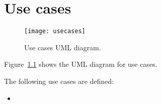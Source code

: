 \chapter{Use cases}\label{ch:usecases}

\begin{figure}[p]
	\texttt{[image: usecases]}
	\caption{Use cases UML diagram.}
	\label{fig:usecases}
\end{figure}

Figure~\ref{fig:usecases} shows the UML diagram for use cases.

The following use cases are defined:
\begin{itemize}
	\item \textellipsis
\end{itemize}
